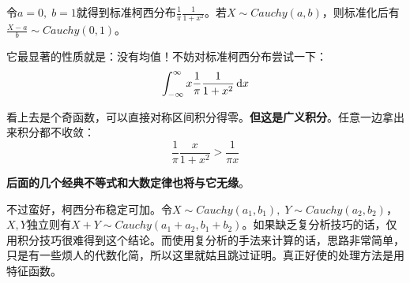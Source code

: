 令$a=0, \;b=1$就得到标准柯西分布$\frac{1}{\pi}\frac{1}{1+x^2}$。若$X\sim Cauchy(a,b)$，则标准化后有$\frac{X-a}{b}\sim Cauchy(0,1)$。

它最显著的性质就是：没有均值！不妨对标准柯西分布尝试一下：
\[
\int_{-\infty}^{\infty} x \frac{1}{\pi} \frac{1}{1+x^2} \mathop{}\!\mathrm{d} x
\]

看上去是个奇函数，可以直接对称区间积分得零。\textbf{但这是广义积分}。任意一边拿出来积分都不收敛：
\[
\frac{1}{\pi} \frac{x}{1+x^2} > \frac{1}{\pi x}
\]

\textbf{后面的几个经典不等式和大数定律也将与它无缘}。

不过蛮好，柯西分布稳定可加。令$X\sim Cauchy(a_1,b_1),\; Y\sim Cauchy(a_2,b_2)$，$X,Y$独立则有$X+Y\sim Cauchy(a_1+a_2,b_1+b_2)$。如果缺乏复分析技巧的话，仅用积分技巧很难得到这个结论。而使用复分析的手法来计算的话，思路非常简单，只是有一些烦人的代数化简，所以这里就姑且跳过证明。真正好使的处理方法是用特征函数。
